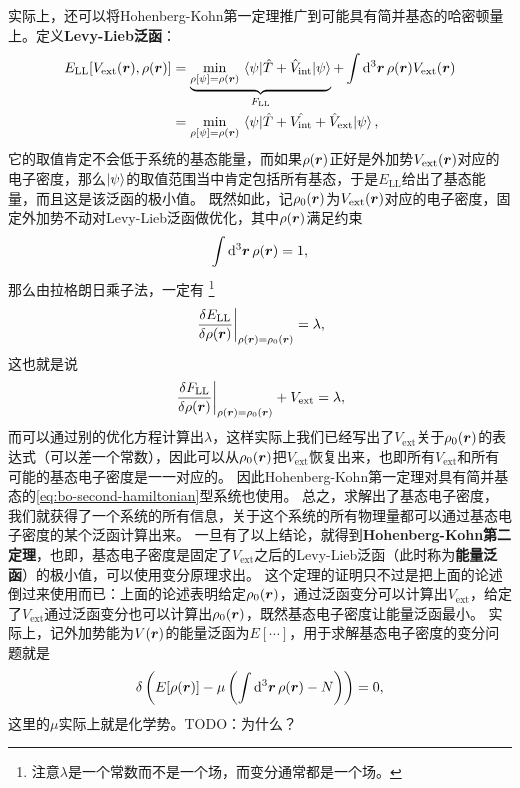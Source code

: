 \documentclass[hyperref, UTF8, a4paper]{ctexart}
\begin{document}
实际上，还可以将Hohenberg-Kohn第一定理推广到可能具有简并基态的哈密顿量上。定义\textbf{Levy-Lieb泛函}：
\begin{equation}
    \begin{aligned}
        E_\text{LL} [V_\text{ext}(\vb*{r}), \rho(\vb*{r})]  &= \underbrace{\min_{\rho[\psi]=\rho(\vb*{r})} \mel{\psi}{\hat{T} + \hat{V}_\text{int}}{\psi}}_{F_\text{LL}} + \int \dd[3]{\vb*{r}} \rho(\vb*{r}) V_\text{ext} (\vb*{r}) \\
        &= \min_{\rho[\psi]=\rho(\vb*{r})} \mel{\psi}{\hat{T} + \hat{V_\text{int}} + \hat{V}_\text{ext}}{\psi},
    \end{aligned}
    \label{eq:levy-lieb}
\end{equation}
它的取值肯定不会低于系统的基态能量，而如果$\rho(\vb*{r})$正好是外加势$V_\text{ext}(\vb*{r})$对应的电子密度，那么$\ket{\psi}$的取值范围当中肯定包括所有基态，于是$E_\text{LL}$给出了基态能量，而且这是该泛函的极小值。
既然如此，记$\rho_0(\vb*{r})$为$V_\text{ext}(\vb*{r})$对应的电子密度，固定外加势不动对Levy-Lieb泛函做优化，其中$\rho(\vb*{r})$满足约束
\[
    \int \dd[3]{\vb*{r}} \rho(\vb*{r}) = 1,
\]
那么由拉格朗日乘子法，一定有%
\footnote{注意$\lambda$是一个常数而不是一个场，而变分通常都是一个场。}%
\[
    \eval{\fdv{E_\text{LL}}{\rho(\vb*{r})}}_{\rho(\vb*{r}) = \rho_0 (\vb*{r})} = \lambda,
\]
这也就是说
\[
    \eval{\fdv{F_\text{LL}}{\rho(\vb*{r})}}_{\rho(\vb*{r}) = \rho_0(\vb*{r})} + V_\text{ext} = \lambda,
\]
而可以通过别的优化方程计算出$\lambda$，这样实际上我们已经写出了$V_\text{ext}$关于$\rho_0(\vb*{r})$的表达式（可以差一个常数），因此可以从$\rho_0(\vb*{r})$把$V_\text{ext}$恢复出来，也即所有$V_\text{ext}$和所有可能的基态电子密度是一一对应的。
因此Hohenberg-Kohn第一定理对具有简并基态的\eqref{eq:bo-second-hamiltonian}型系统也使用。
总之，求解出了基态电子密度，我们就获得了一个系统的所有信息，关于这个系统的所有物理量都可以通过基态电子密度的某个泛函计算出来。
一旦有了以上结论，就得到\textbf{Hohenberg-Kohn第二定理}，也即，基态电子密度是固定了$V_\text{ext}$之后的Levy-Lieb泛函（此时称为\textbf{能量泛函}）的极小值，可以使用变分原理求出。
这个定理的证明只不过是把上面的论述倒过来使用而已：上面的论述表明给定$\rho_0(\vb*{r})$，通过泛函变分可以计算出$V_\text{ext}$，给定了$V_\text{ext}$通过泛函变分也可以计算出$\rho_0(\vb*{r})$，既然基态电子密度让能量泛函最小。
实际上，记外加势能为$V(\vb*{r})$的能量泛函为$E[\cdots]$，用于求解基态电子密度的变分问题就是
\begin{equation}
    \var \left( E[\rho(\vb*{r})] - \mu \left( \int \dd[3]{\vb*{r}} \rho(\vb*{r}) - N \right) \right) = 0,
    \label{eq:dft-variation-principle}
\end{equation}
这里的$\mu$实际上就是化学势。TODO：为什么？
\end{document}

